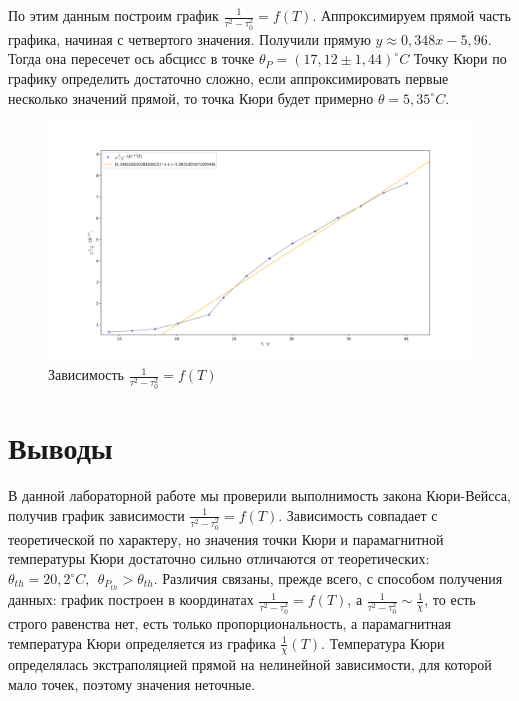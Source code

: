 \documentclass[a4paper, 12pt]{article}
\begin{document}
По этим данным построим график $\frac{1}{\tau^2 - \tau_0^2} = f(T)$. Аппроксимируем прямой часть графика, начиная с четвертого значения. Получили прямую $y \approx 0,348x - 5,96$. Тогда она пересечет ось абсцисс в точке $\theta_P = (17,12 \pm 1,44) ^{\circ}C $
Точку Кюри по графику определить достаточно сложно, если аппроксимировать первые несколько значений прямой, то точка Кюри будет примерно $\theta = 5,35^{\circ}C$.
\begin{figure}[h!]
    \centering
    \includegraphics[width = \textwidth]{lol.png}
    \caption{Зависимость $\frac{1}{\tau^2 - \tau_0^2} = f(T)$}
\end{figure}
\section*{Выводы}
В данной лабораторной работе мы проверили выполнимость закона Кюри-Вейсса, получив график зависимости $\frac{1}{\tau^2 - \tau_0^2} = f(T)$. Зависимость совпадает с теоретической по характеру, но значения точки Кюри и парамагнитной температуры Кюри достаточно сильно отличаются от теоретических: $\theta_{th} = 20,2^{\circ}C, \ \ \theta_{P_{th}} > \theta_{th}$. Различия связаны, прежде всего, с способом получения данных: график построен в координатах $\frac{1}{\tau^2 - \tau_0^2} = f(T)$, а $\frac{1}{\tau^2 - \tau_0^2} \sim \frac{1}{\chi}$, то есть строго равенства нет, есть только пропорциональность, а парамагнитная температура Кюри определяется из графика $\frac{1}{\chi}(T)$. Температура Кюри определялась экстраполяцией прямой на нелинейной зависимости, для которой мало точек, поэтому значения неточные.
\end{document}
